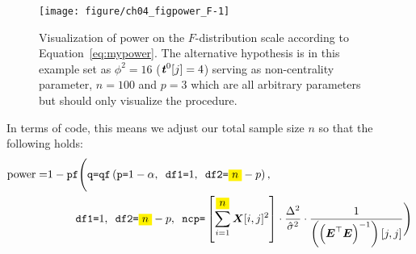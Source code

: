 \documentclass[11pt,a4paper,twoside]{book}\usepackage[]{graphicx}\usepackage[]{xcolor}
\newenvironment{knitrout}{}{} %
\begin{document}
\begin{figure}[h]%
\begin{center}
\begin{knitrout}
\color{fgcolor}
\texttt{[image: figure/ch04\_figpower\_F-1]} 
\end{knitrout}
\end{center}
\vspace{-1.3cm}
\caption{Visualization of power on the $F$-distribution scale according to Equation~\eqref{eq:mypower}. The alternative hypothesis is in this example set as $\phi^2=16$ (${\textbf{\textit{t}}}^0[j]=4$) serving as non-centrality parameter, $n=100$ and $p=3$  which are all arbitrary parameters but should only visualize the procedure.}
\label{fig:power_F}
\end{figure}
In terms of code, this means we adjust our total sample size $n$ so that the following holds:
\begin{align}
\text{power}=&1-\texttt{pf}\Biggl(\texttt{q=}\texttt{qf}\left(\texttt{p=}1-\alpha,\texttt{ df1=}1,\texttt{ df2=}\mathcolorbox{yellow}
{n}-p\right),\nonumber\\
& \qquad\texttt{ df1=}1,\texttt{ df2=}\mathcolorbox{yellow}
{n}-p,\texttt{ ncp=} \left[\sum_{i=1}^{\mathcolorbox{yellow}
{n}}\X[i,j]^2\right]\cdot\frac{\Delta^2}{\hat\sigma^2 }\cdot\frac{1}{\left(\left(\bE^\top\bE\right)^{-1}\right)[j,j]}\Biggr)\label{eq:mypower_code}
\end{align}
\end{document}

